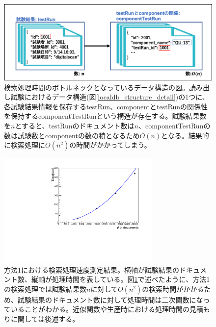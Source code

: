 \begin{figure}[bpt]
  \begin{center}
    \includegraphics[width=12cm]{./search_python_testRun.png}
  \caption[検索処理時間のボトルネックとなっているデータ構造]{検索処理時間のボトルネックとなっているデータ構造の図。読み出し試験におけるデータ構造(図\ref{localdb_structure_detail})の1つに、各試験結果情報を保存するtestRun、componentとtestRunの関係性を保持するcomponentTestRunという構造が存在する。試験結果数を$n$とすると、testRunのドキュメント数は$n$、componentTestRunの数は試験数とcomponentの数の積となるため$O(n)$となる。結果的に検索処理に$O(n^2)$の時間がかかってしまう。}
  \label{search_python_testRun}
  \end{center}
\end{figure}

\begin{figure}[bpt]
  \begin{center}
    \includegraphics[width=8cm,angle=270]{./result_python_list_search.pdf}
  \caption[方法1における検索処理速度測定結果]{方法1における検索処理速度測定結果。横軸が試験結果のドキュメント数、縦軸が処理時間を表している。図\ref{search_python_testRun}で述べたように、方法1の検索処理では試験結果数$n$に対して$O(n^2)$の検索時間がかかるため、試験結果のドキュメント数に対して処理時間は二次関数になっていることがわかる。近似関数や生産時における処理時間の見積もりに関しては後述する。}
  \label{searching_time_python_list}
  \end{center}
\end{figure}


